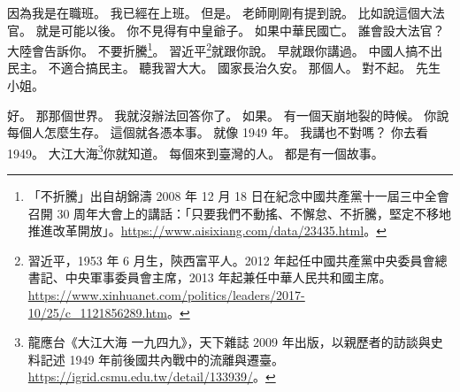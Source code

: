 \hypertarget{w01:cue:3846}{}因為我是在職班。
\hypertarget{w01:cue:3847}{}我已經在上班。
\hypertarget{w01:cue:3848}{}但是。
\hypertarget{w01:cue:3849}{}老師剛剛有提到說。
\hypertarget{w01:cue:3850}{}比如說這個大法官。
\hypertarget{w01:cue:3851}{}就是可能以後。
\hypertarget{w01:cue:3852}{}你不見得有中皇爺子。
\hypertarget{w01:cue:3853}{}如果中華民國亡。
\hypertarget{w01:cue:3854}{}誰會設大法官？
\hypertarget{w01:cue:3855}{}大陸會告訴你。
\hypertarget{w01:cue:3856}{}不要折騰\footnote{「不折騰」出自胡錦濤 2008 年 12 月 18 日在紀念中國共產黨十一屆三中全會召開 30 周年大會上的講話：「只要我們不動搖、不懈怠、不折騰，堅定不移地推進改革開放」。\url{https://www.aisixiang.com/data/23435.html}。}。
\hypertarget{w01:cue:3857}{}習近平\footnote{習近平，1953 年 6 月生，陝西富平人。2012 年起任中國共產黨中央委員會總書記、中央軍事委員會主席，2013 年起兼任中華人民共和國主席。\url{https://www.xinhuanet.com/politics/leaders/2017-10/25/c_1121856289.htm}。}就跟你說。
\hypertarget{w01:cue:3858}{}早就跟你講過。
\hypertarget{w01:cue:3859}{}中國人搞不出民主。
\hypertarget{w01:cue:3860}{}不適合搞民主。
\hypertarget{w01:cue:3861}{}聽我習大大。
\hypertarget{w01:cue:3862}{}國家長治久安。
\hypertarget{w01:cue:3863}{}那個人。
\hypertarget{w01:cue:3864}{}對不起。
\hypertarget{w01:cue:3865}{}先生小姐。

\hypertarget{w01:cue:3866}{}好。
\hypertarget{w01:cue:3867}{}那那個世界。
\hypertarget{w01:cue:3868}{}我就沒辦法回答你了。
\hypertarget{w01:cue:3869}{}如果。
\hypertarget{w01:cue:3870}{}有一個天崩地裂的時候。
\hypertarget{w01:cue:3871}{}你說每個人怎麼生存。
\hypertarget{w01:cue:3872}{}這個就各憑本事。
\hypertarget{w01:cue:3873}{}就像 1949 年。
\hypertarget{w01:cue:3874}{}我講也不對嗎？
\hypertarget{w01:cue:3875}{}你去看 1949。
\hypertarget{w01:cue:3876}{}大江大海\footnote{龍應台《大江大海 一九四九》，天下雜誌 2009 年出版，以親歷者的訪談與史料記述 1949 年前後國共內戰中的流離與遷臺。\url{https://igrid.csmu.edu.tw/detail/133939/}。}你就知道。
\hypertarget{w01:cue:3877}{}每個來到臺灣的人。
\hypertarget{w01:cue:3878}{}都是有一個故事。

